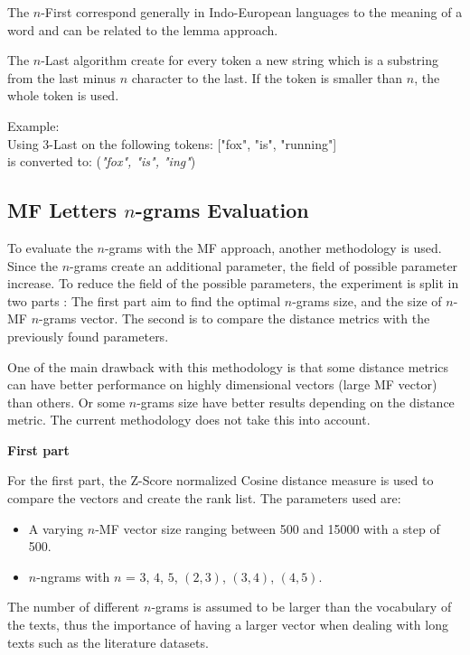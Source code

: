 The $n$-First correspond generally in Indo-European languages to the meaning of a word and can be related to the lemma approach.

\begin{definition}[$n$-Last]
  \label{def:n_last}
  The $n$-Last algorithm create for every token a new string which is a substring from the last minus $n$ character to the last.
  If the token is smaller than $n$, the whole token is used.

  Example: \\
  Using $3$-Last on the following tokens: ["fox", "is", "running"] \\
  is converted to: (\textit{"fox", "is", "ing"})
\end{definition}

\subsection{MF Letters $n$-grams Evaluation}

To evaluate the $n$-grams with the MF approach, another methodology is used.
Since the $n$-grams create an additional parameter, the field of possible parameter increase.
To reduce the field of the possible parameters, the experiment is split in two parts :
The first part aim to find the optimal $n$-grams size, and the size of $n$-MF $n$-grams vector.
The second is to compare the distance metrics with the previously found parameters.

One of the main drawback with this methodology is that some distance metrics can have better performance on highly dimensional vectors (large MF vector) than others.
Or some $n$-grams size have better results depending on the distance metric.
The current methodology does not take this into account.

\textbf{First part}

For the first part, the Z-Score normalized Cosine distance measure is used to compare the vectors and create the rank list.
The parameters used are:

\begin{itemize}
  \item
  A varying $n$-MF vector size ranging between 500 and 15000 with a step of 500.
  \item
  $n$-ngrams with $n$ = $3$, $4$, $5$, $(2, 3)$, $(3, 4)$, $(4, 5)$.
\end{itemize}

The number of different $n$-grams is assumed to be larger than the vocabulary of the texts, thus the importance of having a larger vector when dealing with long texts such as the literature datasets.

